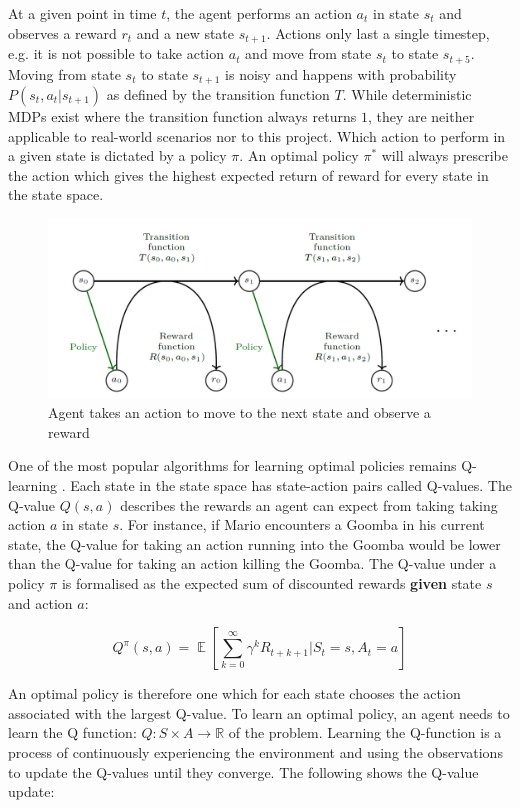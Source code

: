 \documentclass[notitlepage,a4paper,11pt]{article}
\newcommand{\R}{\mathbb{R}}
\DeclareMathOperator{\E}{\mathbb{E}}
\begin{document}
At a given point in time $t$, the agent performs an action $a_t$ in state $s_t$ and observes a reward $r_t$ and a new state $s_{t+1}$. Actions only last a single timestep, e.g. it is not possible to take action $a_t$ and move from state $s_t$ to state $s_{t+5}$. Moving from state $s_t$ to state $s_{t+1}$ is noisy and happens with probability $P(s_t, a_t | s_{t+1})$ as defined by the transition function $T$. While deterministic MDPs exist where the transition function always returns $1$, they are neither applicable to real-world scenarios nor to this project. Which action to perform in a given state is dictated by a policy $\pi$. An optimal policy $\pi^*$ will always prescribe the action which gives the highest expected return of reward for every state in the state space.

\begin{figure}[!htb]
\centering
\includegraphics[width=.5\linewidth]{figs/mdp_detail.png}
\caption{Agent takes an action to move to the next state and observe a reward \protect\cite{franccois2018introduction}} \label{fig:2}
\end{figure}

One of the most popular algorithms for learning optimal policies remains Q-learning \cite{watkins1992q}. Each state in the state space has state-action pairs called Q-values. The Q-value $Q(s,a)$ describes the rewards an agent can expect from taking taking action $a$ in state $s$. For instance, if Mario encounters a Goomba in his current state, the Q-value for taking an action running into the Goomba would be lower than the Q-value for taking an action killing the Goomba. The Q-value under a policy $\pi$ is formalised as the expected sum of discounted rewards \textbf{given} state $s$ and action $a$:

\begin{equation}
 Q^\pi(s, a) = \E \left[ \sum_{k=0}^{\infty} \gamma^k R_{t+k+1} \Big| S_t = s, A_t = a \right]
\end{equation}


An optimal policy is therefore one which for each state chooses the action associated with the largest Q-value. To learn an optimal policy, an agent needs to learn the Q function: $Q : S \times A \to \R$ of the problem. Learning the Q-function is a process of continuously experiencing the environment and using the observations to update the Q-values until they converge. The following shows the Q-value update:
\end{document}
